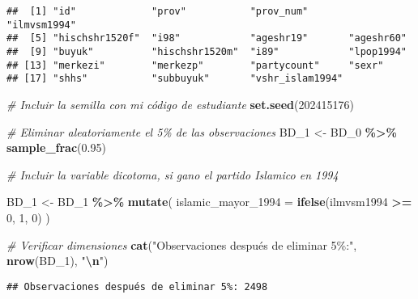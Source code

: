 \documentclass[
]{article}
\newenvironment{Shaded}{\begin{snugshade}}{\end{snugshade}}
\newcommand{\AttributeTok}[1]{\textcolor[rgb]{0.13,0.29,0.53}{#1}}
\newcommand{\CommentTok}[1]{\textcolor[rgb]{0.56,0.35,0.01}{\textit{#1}}}
\newcommand{\DecValTok}[1]{\textcolor[rgb]{0.00,0.00,0.81}{#1}}
\newcommand{\FloatTok}[1]{\textcolor[rgb]{0.00,0.00,0.81}{#1}}
\newcommand{\FunctionTok}[1]{\textcolor[rgb]{0.13,0.29,0.53}{\textbf{#1}}}
\newcommand{\NormalTok}[1]{#1}
\newcommand{\OtherTok}[1]{\textcolor[rgb]{0.56,0.35,0.01}{#1}}
\newcommand{\SpecialCharTok}[1]{\textcolor[rgb]{0.81,0.36,0.00}{\textbf{#1}}}
\newcommand{\StringTok}[1]{\textcolor[rgb]{0.31,0.60,0.02}{#1}}
\begin{document}
\begin{verbatim}
##  [1] "id"             "prov"           "prov_num"       "ilmvsm1994"    
##  [5] "hischshr1520f"  "i98"            "ageshr19"       "ageshr60"      
##  [9] "buyuk"          "hischshr1520m"  "i89"            "lpop1994"      
## [13] "merkezi"        "merkezp"        "partycount"     "sexr"          
## [17] "shhs"           "subbuyuk"       "vshr_islam1994"
\end{verbatim}

\begin{Shaded}
\begin{Highlighting}[]
\CommentTok{\# Incluir la semilla con mi código de estudiante}
\FunctionTok{set.seed}\NormalTok{(}\DecValTok{202415176}\NormalTok{)}

\CommentTok{\# Eliminar aleatoriamente el 5\% de las observaciones}
\NormalTok{BD\_1 }\OtherTok{\textless{}{-}}\NormalTok{ BD\_0 }\SpecialCharTok{\%\textgreater{}\%} \FunctionTok{sample\_frac}\NormalTok{(}\FloatTok{0.95}\NormalTok{)}

\CommentTok{\# Incluir la variable dicotoma, si gano el partido Islamico en 1994}

\NormalTok{BD\_1 }\OtherTok{\textless{}{-}}\NormalTok{ BD\_1 }\SpecialCharTok{\%\textgreater{}\%}
  \FunctionTok{mutate}\NormalTok{(}
    \AttributeTok{islamic\_mayor\_1994 =} \FunctionTok{ifelse}\NormalTok{(ilmvsm1994 }\SpecialCharTok{\textgreater{}=} \DecValTok{0}\NormalTok{, }\DecValTok{1}\NormalTok{, }\DecValTok{0}\NormalTok{)}
\NormalTok{  )}

\CommentTok{\# Verificar dimensiones}
\FunctionTok{cat}\NormalTok{(}\StringTok{"Observaciones después de eliminar 5\%:"}\NormalTok{, }\FunctionTok{nrow}\NormalTok{(BD\_1), }\StringTok{"}\SpecialCharTok{\textbackslash{}n}\StringTok{"}\NormalTok{)}
\end{Highlighting}
\end{Shaded}

\begin{verbatim}
## Observaciones después de eliminar 5%: 2498
\end{verbatim}
\end{document}
